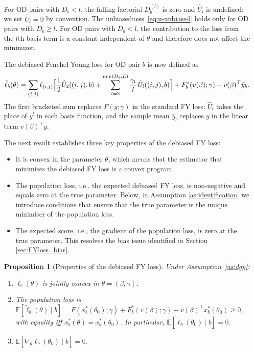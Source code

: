 \documentclass[12pt]{article}
\newtheorem{proposition}{Proposition}
\begin{document}
For OD pairs with $D_b < l$, the falling factorial $D_b^{(l)}$ is zero and $\hat{U}_l$ is undefined; we set $\hat{U}_l = 0$ by convention. The unbiasedness~\eqref{eq:u-unbiased} holds only for OD pairs with $D_b \geq l$. For OD pairs with $D_b < l$, the contribution to the loss from the $l$th basis term is a constant independent of $\theta$ and therefore does not affect the minimizer.


The debiased Fenchel-Young loss for OD pair $b$ is now defined as
\begin{equation}\label{eq:debiased-fy}
    \tilde{\ell}_b(\theta)
    = \sum_{(i,j)} \ell_{(i,j)} \Bigl[
        \frac{1}{2} \hat{U}_2((i,j), b)
        + \sum_{l=3}^{\min(D_b, L)} \frac{\gamma_l}{l}\,
        \hat{U}_l((i,j), b) \Bigr]
    + F^*_b(v(\beta); \gamma)
    - v(\beta)^\top \bar{y}_b.
\end{equation}
The first bracketed sum replaces $F(y; \gamma)$ in the standard FY loss: $\hat{U}_l$ takes the place of $y^l$ in each basis function, and the sample mean $\bar{y}_b$ replaces $y$ in the linear term $v(\beta)^\top y$.

The next result establishes three key properties of the debiased FY loss: 
\begin{itemize}
    \item It is convex in the parameter $\theta$, which means that the estimator that minimises the debiased FY loss is a convex program.
    \item The population loss, i.e., the expected debiased FY loss, is non-negative and equals zero at the true parameter. Below, in Assumption \ref{as:identification} we introduce conditions that ensure that the true parameter is the unique minimiser of the population loss.
    \item The expected score, i.e., the gradient of the population loss, is zero at the true parameter. This resolves the bias issue identified in Section \ref{sec:FYloss_bias}. 
\end{itemize}

\begin{proposition}[Properties of the debiased FY loss]%
\label{prop:debiased}
Under Assumption~\ref{as:dgp}:
\begin{enumerate}
    \item[(i)] $\tilde{\ell}_b(\theta)$ is jointly convex in
    $\theta = (\beta, \gamma)$.
    \item[(ii)] The population loss is
    $\mathbb{E}[\tilde{\ell}_b(\theta) \mid b]
    = F(x^*_b(\theta_0); \gamma) + F^*_b(v(\beta); \gamma)
    - v(\beta)^\top x^*_b(\theta_0)
    \geq 0$, with equality iff $x^*_b(\theta) = x^*_b(\theta_0)$.
    In particular, $\mathbb{E}[\tilde{\ell}_b(\theta_0) \mid b] = 0$.
    \item[(iii)] $\mathbb{E}[\nabla_\theta \tilde{\ell}_b(\theta_0)
    \mid b] = 0$.
\end{enumerate}
\end{proposition}
\end{document}
